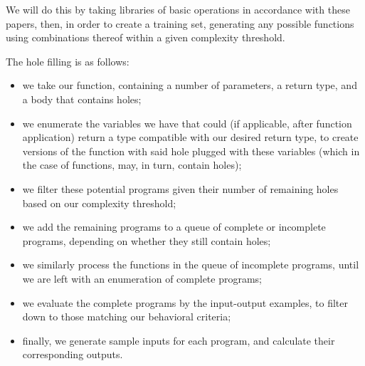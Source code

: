 \documentclass{article}
\begin{document}


We will do this by taking libraries of basic operations in accordance with these papers, then, in order to create a training set, generating any possible functions using combinations thereof within a given complexity threshold.

The hole filling is as follows:
\begin{itemize}
    \item we take our function, containing a number of parameters, a return type, and a body that contains holes;
    \item we enumerate the variables we have that could (if applicable, after function application) return a type compatible with our desired return type, to create versions of the function with said hole plugged with these variables (which in the case of functions, may, in turn, contain holes);
    \item we filter these potential programs given their number of remaining holes based on our complexity threshold;
    \item we add the remaining programs to a queue of complete or incomplete programs, depending on whether they still contain holes;
    \item we similarly process the functions in the queue of incomplete programs, until we are left with an enumeration of complete programs;
    \item we evaluate the complete programs by the input-output examples, to filter down to those matching our behavioral criteria;
    \item finally, we generate sample inputs for each program, and calculate their corresponding outputs.
\end{itemize}
\end{document}
